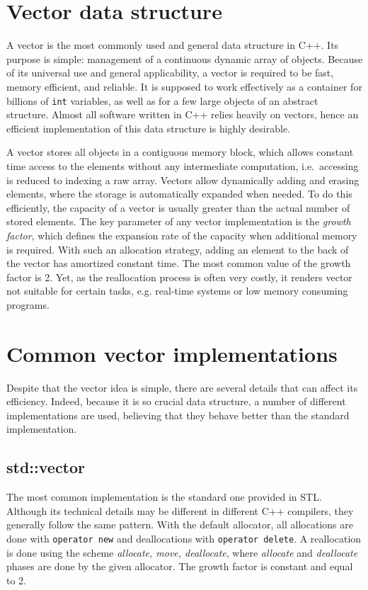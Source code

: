 \documentclass[inz, english, shortabstract]{iithesis}
\begin{document}


\chapter{Vector data structure}

A vector is the most commonly used and general data structure in C++. Its purpose is simple: management of a continuous dynamic array of objects. Because of its universal use and general applicability, a vector is required to be fast, memory efficient, and reliable. It is supposed to work effectively as a container for billions of {\tt int} variables, as well as for a few large objects of an abstract structure. Almost all software written in C++ relies heavily on vectors, hence an efficient implementation of this data structure is highly desirable.

A vector stores all objects in a contiguous memory block, which allows constant time access to the elements without any intermediate computation, i.e.\ accessing is reduced to indexing a raw array. Vectors allow dynamically adding and erasing elements, where the storage is automatically expanded when needed. To do this efficiently, the capacity of a vector is usually greater than the actual number of stored elements. The key parameter of any vector implementation is the \emph{growth factor}, which defines the expansion rate of the capacity when additional memory is required. With such an allocation strategy, adding an element to the back of the vector has amortized constant time. The most common value of the growth factor is 2. Yet, as the reallocation process is often very costly, it renders vector not suitable for certain tasks, e.g. real-time systems or low memory consuming programs.


\chapter{Common vector implementations}

Despite that the vector idea is simple, there are several details that can affect its efficiency.
Indeed, because it is so crucial data structure, a number of different implementations are used, believing that they behave better than the standard implementation.

\section{std::vector}
The most common implementation is the standard one provided in STL.
Although its technical details may be different in different C++ compilers, they generally follow the same pattern.
With the default allocator, all allocations are done with {\tt operator new} and deallocations with {\tt operator delete}. A reallocation is done using the scheme \emph{allocate, move, deallocate}, where \emph{allocate} and \emph{deallocate} phases are done by the given allocator. The growth factor is constant and equal to 2.
\end{document}
